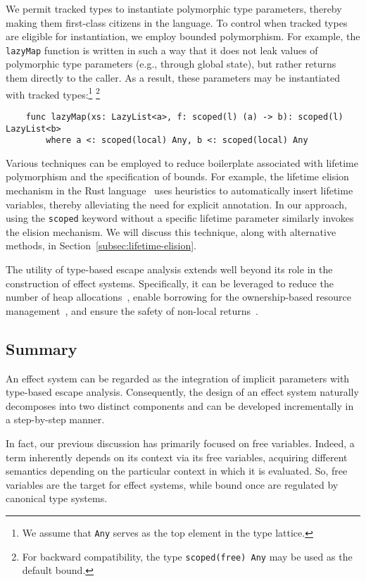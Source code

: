 \documentclass[acmsmall]{acmart}
\begin{document}
We permit tracked types to instantiate polymorphic type parameters, thereby making them first-class citizens in the language.
To control when tracked types are eligible for instantiation, we employ bounded polymorphism.
For example, the \texttt{lazyMap} function is written in such a way that it does not leak values of polymorphic type parameters (e.g., through global state), but rather returns them directly to the caller.
As a result, these parameters may be instantiated with tracked types:\footnote{We assume that \texttt{Any} serves as the top element in the type lattice.} \footnote{For backward compatibility, the type \texttt{scoped(free) Any} may be used as the default bound.}
\begin{verbatim}
    func lazyMap(xs: LazyList<a>, f: scoped(l) (a) -> b): scoped(l) LazyList<b>
        where a <: scoped(local) Any, b <: scoped(local) Any
\end{verbatim}

Various techniques can be employed to reduce boilerplate associated with lifetime polymorphism and the specification of bounds.
For example, the lifetime elision mechanism in the Rust language~\cite{matsakis2014rust} uses heuristics to automatically insert lifetime variables, thereby alleviating the need for explicit annotation.
In our approach, using the \texttt{scoped} keyword without a specific lifetime parameter similarly invokes the elision mechanism.
We will discuss this technique, along with alternative methods, in Section~\ref{subsec:lifetime-elision}.

The utility of type-based escape analysis extends well beyond its role in the construction of effect systems.
Specifically, it can be leveraged to reduce the number of heap allocations~\cite{lorenzen2024oxidizing}, enable borrowing for the ownership-based resource management~\cite{matsakis2014rust, lorenzen2024oxidizing}, and ensure the safety of non-local returns~\cite{akhin2021kotlin}.

\subsection{Summary} \label{subsec:idea-summary}

An effect system can be regarded as the integration of implicit parameters with type-based escape analysis.
Consequently, the design of an effect system naturally decomposes into two distinct components and can be developed incrementally in a step-by-step manner.

In fact, our previous discussion has primarily focused on free variables.
Indeed, a term inherently depends on its context via its free variables, acquiring different semantics depending on the particular context in which it is evaluated.
So, free variables are the target for effect systems, while bound once are regulated by canonical type systems.
\end{document}
